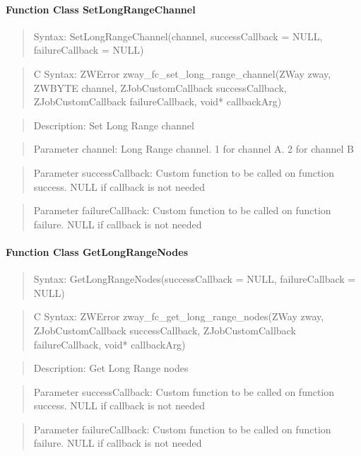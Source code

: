 \paragraph{Function Class SetLongRangeChannel}
\begin{quote}Syntax: SetLongRangeChannel(channel, successCallback = NULL, failureCallback = NULL)\end{quote}
\begin{quote}C Syntax: ZWError zway\_fc\_set\_long\_range\_channel(ZWay zway, ZWBYTE channel, ZJobCustomCallback successCallback, ZJobCustomCallback failureCallback, void* callbackArg)\end{quote}
\begin{quote}Description: Set Long Range channel\end{quote}
\begin{quote}Parameter channel: Long Range channel. 1 for channel A. 2 for channel B\end{quote}
\begin{quote}Parameter successCallback: Custom function to be called on function success. NULL if callback is not needed\end{quote}
\begin{quote}Parameter failureCallback: Custom function to be called on function failure. NULL if callback is not needed\end{quote}


\paragraph{Function Class GetLongRangeNodes}
\begin{quote}Syntax: GetLongRangeNodes(successCallback = NULL, failureCallback = NULL)\end{quote}
\begin{quote}C Syntax: ZWError zway\_fc\_get\_long\_range\_nodes(ZWay zway, ZJobCustomCallback successCallback, ZJobCustomCallback failureCallback, void* callbackArg)\end{quote}
\begin{quote}Description: Get Long Range nodes\end{quote}
\begin{quote}Parameter successCallback: Custom function to be called on function success. NULL if callback is not needed\end{quote}
\begin{quote}Parameter failureCallback: Custom function to be called on function failure. NULL if callback is not needed\end{quote}

